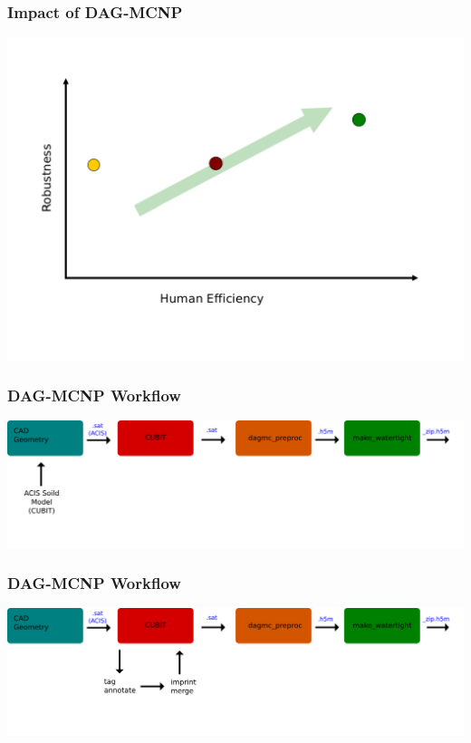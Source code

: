 \documentclass[14pt]{beamer}
\begin{document}
\begin{frame}
\frametitle{Impact of DAG-MCNP}
\includegraphics[scale=0.43, trim = 0 0 28 0]{InitialGraphImpact.png}
\end{frame}


\begin{frame}
\frametitle{DAG-MCNP Workflow}
\begin{center}
\includegraphics[scale=0.23, trim = 40 200 0 0]{DAGMC_Wrkflw1.png}
\end{center}
\end{frame}


\begin{frame}
\frametitle{DAG-MCNP Workflow}
\begin{center}
\includegraphics[scale=0.23, trim = 40 200 0 0]{DAGMC_Wrkflw2.png}
\end{center}
\end{frame}
\end{document}
